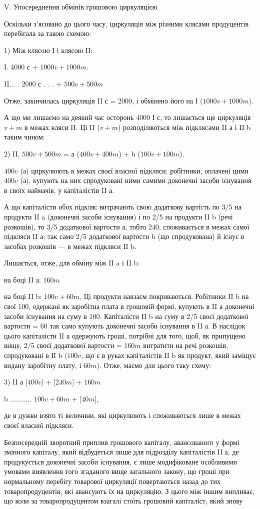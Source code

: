 V. Упосереднення обмінів грошовою циркуляцією

Оскільки з’ясовано до цього часу, циркуляція між різними клясами
продуцентів перебігала за такою схемою:

1) Між клясою І і клясою II:

І. 4000 с + $1000 v + 1000 m$.

II... .    2000 с . . . + $500 v + 500 m$

Отже, закінчилась циркуляція II с = 2000, і обмінено його на
І ($1000 v + 1000 m$).

А що ми лишаємо на деякий час осторонь 4000 І с, то лишається ще
циркуляція $v + m$ в межах кляси II. Ці II ($v + m$) розподіляються між
підклясами II а і II b таким чином:

2) II. $500 v + 500 m$ = а ($400 v + 400 m$) + b ($100 v + 100 m$).

$400 v$ (а) циркулюють в межах своєї власної підкляси; робітники,
оплачені цими $400 v$ (а), купують на них спродуковані ними самими доконечні
засоби існування в своїх наймачів, у капіталістів II а.

А що капіталісти обох підкляс витрачають свою додаткову вартість
по 3/5 на продукти II a (доконечні засоби існування) і по 2/5 на продукти
II b (речі розкошів), то 3/5 додаткової вартости а, тобто 240, споживається
в межах самої підкляси II а; так само 2/5 додаткової вартости b (що спродукована)
й існує в засобах розкошів — в межах підкляси II b.

Лишається, отже, для обміну між II a і II b:

на боці II а: $160 m$

на боці II b: $100 v + 60 m$. Ці продукти навзаєм покриваються. Робітники
II b на свої 100, одержані як заробітна плата в грошовій формі,
купують в II а доконечні засоби існування на суму в 100. Капіталісти
II b на суму в 2/5 своєї додаткової вартости = 60 так само купують
доконечні засоби існування в II а. В наслідок цього капіталісти II а одержують
гроші, потрібні для того, щоб, як припущено вище, 2/5 своєї
додаткової вартости = $160 m$ витратити на речі розкошів, спродуковані
в ІІ b ($100 v$, що є в руках капіталістів II b як продукт, який заміщує
видану заробітну плату, і $60 m$). Отже, маємо для цього таку схему:

3) II а [$400 v$] + [$240 m$] + $160 m$

b ........... $100 v + 60 m$ + [$40 m$],

де в дужки взято ті величини, які циркулюють і споживаються лише в
межах своєї власної підкляси.

Безпосередній зворотний приплив грошового капіталу, авансованого у
формі змінного капіталу, який відбудеться лише для підрозділу капіталістів
II а, де продукується доконечні засоби існування, є лише модифіковане
особливими умовами виявлення того згаданого вище
загального закону, що гроші при нормальному перебігу товарової
циркуляції повертаються назад до тих товаропродуцентів, які авансують
їх на циркуляцію. З цього між іншим випливає, що коли за
товаропродуцентом взагалі стоїть грошовий капіталіст, який знову
\parbreak{}  %

